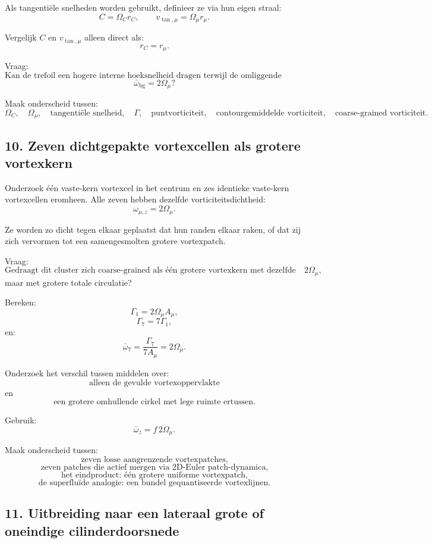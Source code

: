 \documentclass[11pt,a4paper]{article}
\begin{document}
Als tangentiële snelheden worden gebruikt, definieer ze via hun eigen straal:
\[
C=\Omega_C r_C,
\qquad
v_{\tan,\mu}=\Omega_{\mu}r_{\mu}.
\]

Vergelijk \(C\) en \(v_{\tan,\mu}\) alleen direct als:
\[
r_C=r_{\mu}.
\]

Vraag:
\[
\text{Kan de trefoil een hogere interne hoeksnelheid dragen terwijl de omliggende coarse-grained achtergrondvorticiteit gelijk blijft aan}
\]
\[
\bar{\omega}_{\mathrm{bg}}=2\Omega_{\mu}?
\]

Maak onderscheid tussen:
\[
\Omega_C,
\quad
\Omega_{\mu},
\quad
\text{tangentiële snelheid},
\quad
\Gamma,
\quad
\text{puntvorticiteit},
\quad
\text{contourgemiddelde vorticiteit},
\quad
\text{coarse-grained vorticiteit}.
\]

\subsection{10. Zeven dichtgepakte vortexcellen als grotere vortexkern}

Onderzoek één vaste-kern vortexcel in het centrum en zes identieke vaste-kern vortexcellen eromheen. Alle zeven hebben dezelfde vorticiteitsdichtheid:
\[
\omega_{\mu,z}=2\Omega_{\mu}.
\]

Ze worden zo dicht tegen elkaar geplaatst dat hun randen elkaar raken, of dat zij zich vervormen tot een samengesmolten grotere vortexpatch.

Vraag:
\[
\text{Gedraagt dit cluster zich coarse-grained als één grotere vortexkern met dezelfde effectieve vorticiteitsdichtheid }2\Omega_{\mu},
\]
maar met grotere totale circulatie?

Bereken:
\[
\Gamma_1=2\Omega_{\mu}A_{\mu},
\]
\[
\Gamma_7=7\Gamma_1,
\]
en:
\[
\bar{\omega}_7
=
\frac{\Gamma_7}{7A_{\mu}}
=
2\Omega_{\mu}.
\]

Onderzoek het verschil tussen middelen over:
\[
\text{alleen de gevulde vortexoppervlakte}
\]
en
\[
\text{een grotere omhullende cirkel met lege ruimte ertussen.}
\]

Gebruik:
\[
\bar{\omega}_z=f\,2\Omega_{\mu}.
\]

Maak onderscheid tussen:
\[
\text{zeven losse aangrenzende vortexpatches,}
\]
\[
\text{zeven patches die actief mergen via 2D-Euler patch-dynamica,}
\]
\[
\text{het eindproduct: één grotere uniforme vortexpatch,}
\]
\[
\text{de superfluïde analogie: een bundel gequantiseerde vortexlijnen.}
\]

\subsection{11. Uitbreiding naar een lateraal grote of oneindige cilinderdoorsnede}
\end{document}
